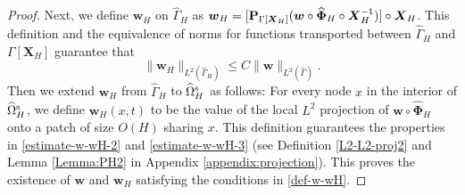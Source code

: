 \documentclass[11pt,reqno]{amsart}
\theoremstyle{definition}
\theoremstyle{plain}
\numberwithin{theorem}{section}
\numberwithin{proposition}{section}
\numberwithin{lemma}{section}
\numberwithin{equation}{section}
\newcommand{\bs}[1]{\boldsymbol{#1}}
\newcommand{\uu}[1]  {{\bs{#1}} }
\newcommand{\dep}{{{\bs{d}}}}
\newcommand{\stress}{{\bs \sigma}}
\newcommand{\bu}{\uu{u}}
\renewcommand{\(}{\bigl(}
\renewcommand{\)}{\bigr)}
\begin{document}
\begin{proof}
Next, we define ${\bs w}_H$ on $\widehat\Gamma_H$ as  
${\bs w}_H = [{\bf P}_{\Gamma[{\bs X}_H]}({\bs w}\circ \widehat{\bs\Phi}_H\circ {\bs X}_H^{-1})] \circ {\bs X}_H $. This definition and the equivalence of norms for functions transported between $\widehat\Gamma_H$ and $\Gamma[{\bs X}_H]$ guarantee that 
$$
\| {\bs w}_H \|_{L^2(\widehat\Gamma_H)} 
\le C\| {\bs w} \|_{L^2(\widehat\Gamma)} . 
$$
Then we extend ${\bs w}_H$ from $\widehat\Gamma_H$ to $\widehat{\Omega}^{\rm s}_H$ as follows: For every node $x$ in the interior of $\widehat{\Omega}^{\rm s}_H$, we define ${\bs w}_H(x,t)$ to be the value of the local $L^2$ projection of ${\bs w}\circ\widehat{\bs\Phi}_H$ onto a patch of size $O(H)$ sharing $x$. This definition guarantees the properties in \eqref{estimate-w-wH-2} and \eqref{estimate-w-wH-3} (see Definition \ref{L2-L2-proj2} and Lemma \ref{Lemma:PH2} in Appendix \ref{appendix:projection}). This proves the existence of ${\bs w}$ and ${\bs w}_H$ satisfying the conditions in \eqref{def-w-wH}.  
\end{proof}



\end{document}
